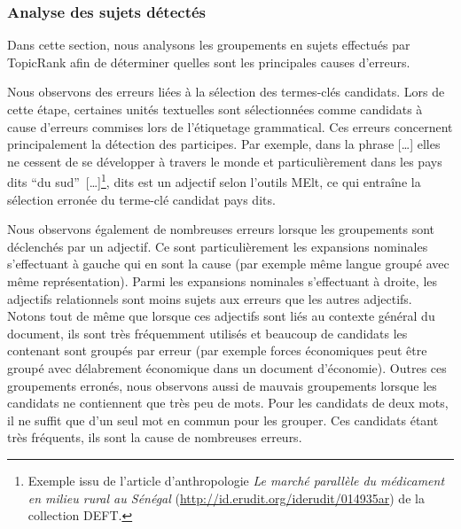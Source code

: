         \subsubsection{Analyse des sujets détectés}
        \label{subsubsec:main-automatic_keyphrase_annotation-unsupervised_automatic_keyphrase_extraction-error_analysis-detected_topics}
          Dans cette section, nous analysons les groupements en sujets effectués
          par Topic\-Rank afin de déterminer quelles sont les principales causes
          d'erreurs.

          Nous observons des erreurs liées à la sélection des termes-clés
          candidats. Lors de cette étape, certaines unités textuelles sont
          sélectionnées comme candidats à cause d'erreurs commises lors de
          l'étiquetage grammatical. Ces erreurs concernent principalement la
          détection des participes. Par exemple, dans la phrase \og{}[\dots]
          elles ne cessent de se développer à travers le monde et
          particulièrement dans les pays dits ``du
          sud''~[\dots]\fg{}\footnote{Exemple issu de l'article d'anthropologie
          \textit{Le marché parallèle du médicament en milieu rural au Sénégal}
          (\url{http://id.erudit.org/iderudit/014935ar}) de la collection
          DEFT.}, \og{}dits\fg{} est un adjectif selon l'outils MElt, ce qui
          entraîne la sélection erronée du terme-clé candidat \og{}pays
          dits\fg{}.

          Nous observons également de nombreuses erreurs lorsque les groupements
          sont déclenchés par un adjectif. Ce sont particulièrement les
          expansions nominales s'effectuant à gauche qui en sont la cause (par
          exemple \og{}même langue\fg{} groupé avec \og{}même
          représentation\fg{}). Parmi les expansions nominales s'effectuant à
          droite, les adjectifs relationnels sont moins sujets aux erreurs que
          les autres adjectifs. Notons tout de même que lorsque ces adjectifs
          sont liés au contexte général du document, ils sont très fréquemment
          utilisés et beaucoup de candidats les contenant sont groupés par
          erreur (par exemple \og{}forces économiques\fg{} peut être groupé
          avec \og{}délabrement économique\fg{} dans un document d'économie).
          Outres ces groupements erronés, nous observons aussi de mauvais
          groupements lorsque les candidats ne contiennent que très peu de mots.
          Pour les candidats de deux mots, il ne suffit que d'un seul mot en
          commun pour les grouper. Ces candidats étant très fréquents, ils sont
          la cause de nombreuses erreurs.

